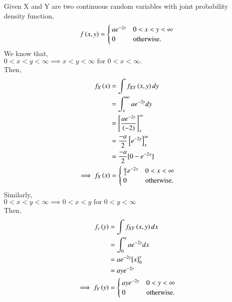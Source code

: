 Given X and Y are two continuous random variables with joint probability density function,
\begin{align}
f\left(x,y\right)= 
\begin{cases}
ae^{-2y} & 0<x<y<\infty \\
0 & \text{otherwise}.
\end{cases}   
\end{align}
We know that,\\
$0<x<y<\infty  \implies x<y<\infty \text{ for } 0<x<\infty.$\\ 
Then,
\begin{align}
    f_X\left(x\right) &= \int f_{XY}\left(x,y\right)dy\\
    &= \int_{x}^{\infty} ae^{-2y}dy\\
    &= \left[ \frac{ae^{-2y}}{(-2)} \right]_{x}^{\infty}\\
    &= \frac{-a}{2}\left[ e^{-2y}\right]_{x}^{\infty}\\
    &= \frac{-a}{2}[0-e^{-2x}]\\
\implies f_X\left(x\right) &=
    \begin{cases}
    \frac{a}{2}e^{-2x} & 0 < x < \infty\\
    0 & \text{otherwise}.
    \end{cases}
\end{align}
Similarly,\\
$ 0<x<y<\infty \implies 0<x<y \text{ for } 0<y<\infty$ \\
Then,
\begin{align}
    f_y\left(y\right) &= \int f_{XY}\left(x,y\right)dx\\
    &= \int_{0}^{y} ae^{-2y}dx\\
    &= ae^{-2y}[x]_{0}^{y}\\
    &= aye^{-2y}\\
\implies f_Y\left(y\right) &=
    \begin{cases}
    aye^{-2y} & 0 < y < \infty\\
    0 & \text{otherwise}.
    \end{cases}
\end{align}
